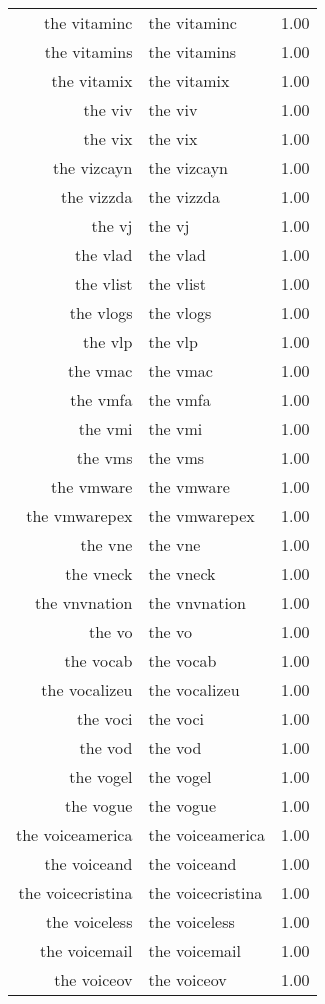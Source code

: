 \begin{table}[ht]
\begin{tabular}{rlr}
  the vitaminc & the vitaminc & 1.00 \\ 
  the vitamins & the vitamins & 1.00 \\ 
  the vitamix & the vitamix & 1.00 \\ 
  the viv & the viv & 1.00 \\ 
  the vix & the vix & 1.00 \\ 
  the vizcayn & the vizcayn & 1.00 \\ 
  the vizzda & the vizzda & 1.00 \\ 
  the vj & the vj & 1.00 \\ 
  the vlad & the vlad & 1.00 \\ 
  the vlist & the vlist & 1.00 \\ 
  the vlogs & the vlogs & 1.00 \\ 
  the vlp & the vlp & 1.00 \\ 
  the vmac & the vmac & 1.00 \\ 
  the vmfa & the vmfa & 1.00 \\ 
  the vmi & the vmi & 1.00 \\ 
  the vms & the vms & 1.00 \\ 
  the vmware & the vmware & 1.00 \\ 
  the vmwarepex & the vmwarepex & 1.00 \\ 
  the vne & the vne & 1.00 \\ 
  the vneck & the vneck & 1.00 \\ 
  the vnvnation & the vnvnation & 1.00 \\ 
  the vo & the vo & 1.00 \\ 
  the vocab & the vocab & 1.00 \\ 
  the vocalizeu & the vocalizeu & 1.00 \\ 
  the voci & the voci & 1.00 \\ 
  the vod & the vod & 1.00 \\ 
  the vogel & the vogel & 1.00 \\ 
  the vogue & the vogue & 1.00 \\ 
  the voiceamerica & the voiceamerica & 1.00 \\ 
  the voiceand & the voiceand & 1.00 \\ 
  the voicecristina & the voicecristina & 1.00 \\ 
  the voiceless & the voiceless & 1.00 \\ 
  the voicemail & the voicemail & 1.00 \\ 
  the voiceov & the voiceov & 1.00 \\ 

\end{tabular}
\end{table}
